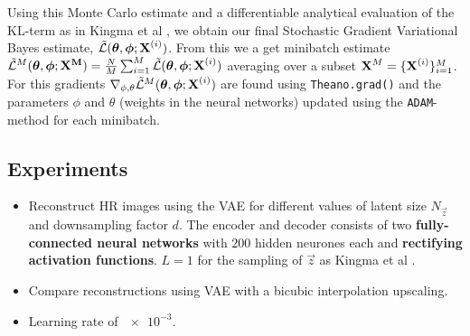 Using this Monte Carlo estimate and a differentiable analytical evaluation of the KL-term as in Kingma et al \cite{Kingma2013}, we obtain our final Stochastic Gradient Variational Bayes estimate, $\tilde{\mathcal{L}}(\bm{\mathrm{\theta}},\bm{\mathrm{\phi}};\bm{\mathrm{X}}^{(i)})$. From this we a get minibatch estimate $\tilde{\mathcal{L}}^M(\bm{\mathrm{\theta}},\bm{\mathrm{\phi}};\bm{\mathrm{X^M}}) = \frac{N}{M}\sum^{M}_{i=1}\tilde{\mathcal{L}}(\bm{\mathrm{\theta}},\bm{\mathrm{\phi}};\bm{\mathrm{X}}^{(i)})$ averaging over a subset $\bm{\mathrm{X}}^M = \{\bm{\mathrm{X}}^{(i)}\}^M_{i=1}$. 
For this gradients $\nabla_{\phi,\theta} \tilde{\mathcal{L}}^M(\bm{\mathrm{\theta}},\bm{\mathrm{\phi}};\bm{\mathrm{X}}^{(i)})$ are found using \texttt{Theano.grad()} and the parameters $\phi$ and $\theta$ (weights in the neural networks) updated using the \texttt{ADAM}-method \cite{Kingma2014b} for each minibatch. 




\subsection{Experiments}
\label{sub:experiments}

\begin{itemize}
	\item Reconstruct HR images using the VAE for different values of latent size $N_{\vec{z}}$ and downsampling factor $d$. The encoder and decoder consists of two \textbf{fully-connected neural networks} with $200$ hidden neurones each and \textbf{rectifying activation functions}. $L = 1$ for the sampling of $\vec{z}$ as Kingma et al \cite{Kingma2013}.
	\item Compare reconstructions using VAE with a bicubic interpolation upscaling.
	\item Learning rate of $\num{e-3}$.
\end{itemize}
